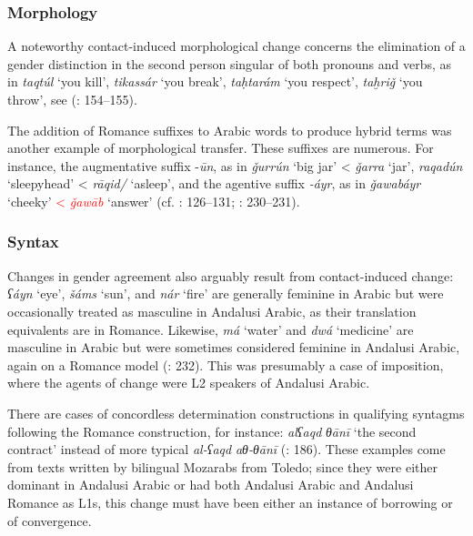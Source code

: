 \documentclass[output=paper,modfonts,nonflat]{langsci/langscibook}
\begin{document}
\subsubsection{Morphology}

A noteworthy contact-induced morphological change concerns the elimination of a gender distinction in the second person singular of both pronouns and verbs, as in \textit{taqtúl} ‘you kill’, \textit{tikassár} ‘you break’, \textit{taḥtarám} ‘you respect’, \textit{taḫriǧ} ‘you throw’, see (\citealt{CorrientePereiraVicente2015}: 154–155).

The addition of Romance suffixes to Arabic words to produce hybrid terms was another example of morphological transfer. These suffixes are numerous. For instance, the augmentative suffix -\textit{ūn}, as in \textit{ǧurrún} ‘big jar’ < \textit{ǧarra} ‘jar’, \textit{raqadún} ‘sleepyhead’ < \textit{rāqid/} ‘asleep’, and the agentive suffix \textit{-áyr}, as in \textit{ǧawabáyr} ‘cheeky’ \textcolor{red}{< \textit{ǧawāb}} `answer' (cf. \citealt{Corriente1992book}: 126–131; \citealt{CorrientePereiraVicente2015}: 230–231). 


\subsubsection{Syntax}

Changes in gender agreement also arguably result from contact-induced change: \textit{ʕáyn} ‘eye’, \textit{šáms} ‘sun’, and \textit{nár} ‘fire’ are generally feminine in Arabic but were occasionally treated as masculine in Andalusi Arabic, as their translation equivalents are in Romance. Likewise, \textit{má} ‘water’ and \textit{dwá} ‘medicine’ are masculine in Arabic but were sometimes considered feminine in Andalusi Arabic, again on a Romance model (\citealt{CorrientePereiraVicente2015}: 232). This was presumably a case of imposition, where the agents of change were L2 speakers of Andalusi Arabic. 

There are cases of concordless determination constructions in qualifying syntagms following the Romance construction, for instance: \textit{alʕaqd} \textit{θānī} ‘the second contract’ instead of more typical \textit{al-ʕaqd} \textit{aθ-θānī} (\citealt{CorrientePereiraVicente2015}: 186). These examples come from texts written by bilingual Mozarabs from Toledo; since they were either dominant in Andalusi Arabic or had both Andalusi Arabic and Andalusi Romance as L1s, this change must have been either an instance of borrowing or of convergence. 
\end{document}
